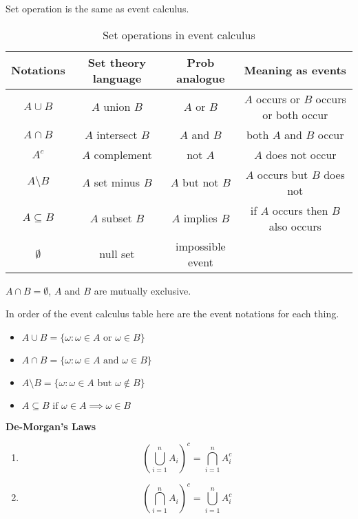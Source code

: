 \documentclass[10pt, a4paper]{article}
\begin{document}
Set operation is the same as event calculus.

\newpage

\begin{table}[h!]
    \centering
    \begin{tabular}{|c|c|c|c|}
        \hline
        Notations & Set theory language & Prob analogue & Meaning as events \\ [0.1em]
        \hline
        $A \cup B$ & $A$ union $B$ & $A$ or $B$ & $A$ occurs or $B$ occurs or both occur \\
        \hline
        $A \cap B$ & $A$ intersect $B$ & $A$ and $B$ & both $A$ and $B$ occur \\
        \hline
        $A^c$ & $A$ complement & not $A$ & $A$ does not occur \\
        $A \setminus B$ & $A$ set minus $B$ & $A$ but not $B$ & $A$ occurs but $B$ does not \\
        \hline
        $A \subseteq B$ & $A$ subset $B$ & $A$ implies $B$ & if $A$ occurs then $B$ also occurs \\
        \hline
        $\emptyset$ & null set & impossible event & \phantom{1} \\
        \hline
    \end{tabular}
    \caption{Set operations in event calculus}
\end{table}

$A \cap B = \emptyset$, $A$ and $B$ are mutually exclusive.

In order of the event calculus table here are the event notations for each thing. 

\begin{itemize}
    \item $A \cup B = \{\omega : \omega \in A \text{ or } \omega \in B\}$
    \item $A \cap B = \{\omega : \omega \in A \text{ and } \omega \in B\}$
    \item $A \setminus B = \{\omega : \omega \in A \text{ but } \omega \notin B\}$
    \item $A \subseteq B \text{ if } \omega \in A \implies \omega \in B$
\end{itemize}

\newpage

\textbf{De-Morgan's Laws}

\begin{enumerate}[label = (\roman*)]
    \item
    \[
    \left(\bigcup_{i = 1}^{n} A_i\right) ^ c = \bigcap_{i = 1}^{n} A_i ^ c
    \]
    \item
    \[
    \left(\bigcap_{i = 1}^{n} A_i\right) ^ c = \bigcup_{i = 1}^{n} A_i ^ c
    \]
\end{enumerate}
\end{document}

